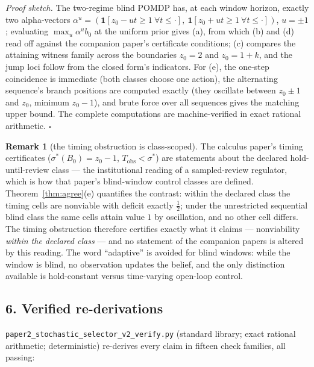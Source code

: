 \documentclass[10pt,twocolumn]{article}
\theoremstyle{definition}
\newtheorem{remark}{Remark}
\begin{document}
\emph{Proof sketch.} The two-regime blind POMDP has, at each window
horizon, exactly two alpha-vectors \(\alpha^{u} = (\mathbf{1}[z_{0} - u t
\ge 1\ \forall t \le \cdot],\ \mathbf{1}[z_{0} + u t \ge 1\ \forall t \le
\cdot])\), \(u = \pm 1\); evaluating \(\max_{u} \alpha^{u} b_{0}\) at the
uniform prior gives (a), from which (b) and (d) read off against the
companion paper's certificate conditions; (c) compares the attaining
witness family across the boundaries \(z_{0} = 2\) and \(z_{0} = 1 + k\),
and the jump loci follow from the closed form's indicators. For (e), the
one-step coincidence is immediate (both classes choose one action), the
alternating sequence's branch positions are computed exactly (they
oscillate between \(z_{0} \pm 1\) and \(z_{0}\), minimum \(z_{0} - 1\)),
and brute force over all sequences gives the matching upper bound. The
complete computations are machine-verified in exact rational arithmetic.
\hfill\(\square\)

\begin{remark}[the timing obstruction is class-scoped]\label{rem:scope}
The calculus paper's timing certificates (\(\sigma^{*}(B_{0}) = z_{0} -
1\), \(T_{\mathrm{obs}} < \sigma^{*}\)) are statements about the declared
hold-until-review class --- the institutional reading of a sampled-review
regulator, which is how that paper's blind-window control classes are
defined. Theorem~\ref{thm:agree}(e) quantifies the contrast: within the
declared class the timing cells are nonviable with deficit exactly
\(\tfrac12\); under the unrestricted sequential blind class the same
cells attain value \(1\) by oscillation, and no other cell differs. The
timing obstruction therefore certifies exactly what it claims —
nonviability \emph{within the declared class} --- and no statement of the
companion papers is altered by this reading. The word ``adaptive'' is
avoided for blind windows: while the window is blind, no observation
updates the belief, and the only distinction available is
hold-constant versus time-varying open-loop control.
\end{remark}

\subsection{6. Verified re-derivations}\label{verified}

\texttt{paper2\_stochastic\_selector\_v2\_verify.py} (standard library;
exact rational arithmetic; deterministic) re-derives every claim in
fifteen check families, all passing:
\end{document}
